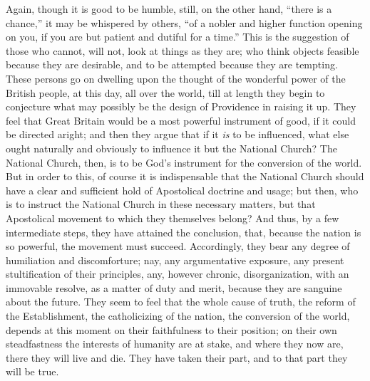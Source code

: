 Again, though it is good to be humble, still, on the other hand,
``there is a chance,'' it may be whispered by others, ``of
a nobler and higher function opening on you, if you are but patient
and dutiful for a time.'' This is the suggestion of those who
cannot, will not, look at things as they are; who think objects
feasible because they are desirable, and to be attempted because they
are tempting. These persons go on dwelling upon the thought of the
wonderful power of the British people, at this day, all over the
world, till at length they begin to conjecture what may possibly be
the design of Providence in raising it up. They feel that Great
Britain would be a most powerful instrument of good, if it could be
directed aright; and then they argue that if it \emph{is} to be
influenced, what else ought naturally and obviously to influence it
but the National Church? The National Church, then, is to be God's
instrument for the conversion of the world. But in order to this, of
course it is indispensable that the National Church should have a
clear and sufficient hold of Apostolical doctrine and usage; but then,
who is to instruct the National Church in these necessary matters, but
that Apostolical movement to which they themselves belong? And thus,
by a few intermediate steps, they have attained the conclusion, that,
because the nation is so powerful, the movement must succeed.
Accordingly, they bear any degree of humiliation and discomforture;
nay, any argumentative exposure, any present stultification of their
principles, any, however chronic, disorganization, with an immovable
resolve, as a matter of duty and merit, because they are sanguine
about the future. They seem to feel that the whole cause of truth, the
reform of the Establishment, the catholicizing of the nation, the
conversion of the world, depends at this moment on their faithfulness
to their position; on their own steadfastness the interests of
humanity are at stake, and where they now are, there they will live
and die. They have taken their part, and to that part they will be
true.

